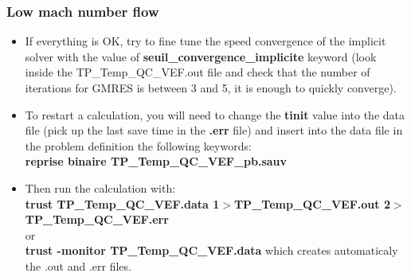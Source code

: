 \documentclass[10pt]{beamer}
\begin{document}
\begin{frame}
\frametitle{Low mach number flow}
\begin{block}{}

\begin{itemize}

\item  If everything is OK, try to fine tune the speed convergence of the implicit solver with the value of \textbf{seuil\_convergence\_implicite} keyword (look inside the TP\_Temp\_QC\_VEF.out file and check that the number of iterations for GMRES is between 3 and 5, it is enough to quickly converge).

\item  To restart a calculation, you will need to change the \textbf{tinit} value into the data file (pick up the last save time in the \textbf{.err} file) and insert into the data file in the problem definition the following keywords: \\
\textbf{reprise binaire TP\_Temp\_QC\_VEF\_pb.sauv}

\item  Then run the calculation with: \\
{\footnotesize{\textbf{trust TP\_Temp\_QC\_VEF.data 1$>$TP\_Temp\_QC\_VEF.out 2$>$TP\_Temp\_QC\_VEF.err}}} \\
or \\
\textbf{trust -monitor TP\_Temp\_QC\_VEF.data} which creates automaticaly the .out and .err files.

\end{itemize}

\end{block}
\end{frame}
\end{document}
